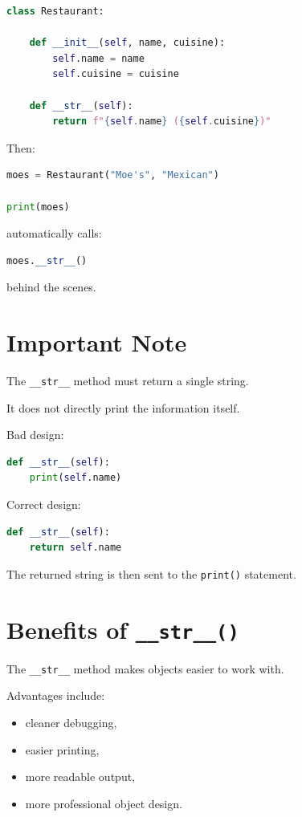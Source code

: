\documentclass[11pt]{article}
\begin{document}
\begin{lstlisting}[language=Python]
class Restaurant:

    def __init__(self, name, cuisine):
        self.name = name
        self.cuisine = cuisine

    def __str__(self):
        return f"{self.name} ({self.cuisine})"
\end{lstlisting}

Then:

\begin{lstlisting}[language=Python]
moes = Restaurant("Moe's", "Mexican")

print(moes)
\end{lstlisting}

automatically calls:

\begin{lstlisting}[language=Python]
moes.__str__()
\end{lstlisting}

behind the scenes.

\section{Important Note}

The \verb|__str__| method must return a single string.

It does not directly print the information itself.

Bad design:

\begin{lstlisting}[language=Python]
def __str__(self):
    print(self.name)
\end{lstlisting}

Correct design:

\begin{lstlisting}[language=Python]
def __str__(self):
    return self.name
\end{lstlisting}

The returned string is then sent to the \verb|print()| statement.

\section{Benefits of \texttt{\_\_str\_\_()}}

The \verb|__str__| method makes objects easier to work with.

Advantages include:

\begin{itemize}
    \item cleaner debugging,
    \item easier printing,
    \item more readable output,
    \item more professional object design.
\end{itemize}
\end{document}
